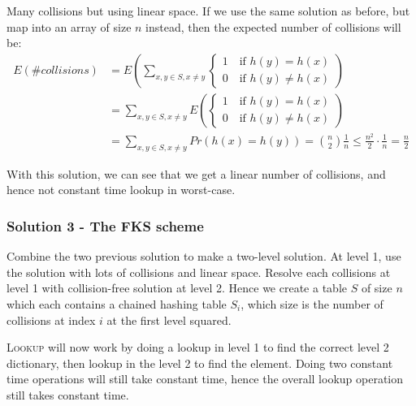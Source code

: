                 Many collisions but using linear space.
                If we use the same solution as before, but map into an array of size $n$ instead, then the expected number of collisions will be:
                \begin{align*}
                    E(\#collisions)
                    &= E\left( \sum_{x,y \in S, x \not = y}
                        \begin{cases}
                            1 \quad \text{if } h(y) = h(x) \\
                            0 \quad \text{if } h(y) \not = h(x)
                        \end{cases}
                        \right) \\
                    &= \sum_{x,y \in S, x \not = y} E \left(
                        \begin{cases}
                            1 \quad \text{if } h(y) = h(x) \\
                            0 \quad \text{if } h(y) \not = h(x)
                        \end{cases}
                        \right) \\
                    &= \sum_{x,y \in S, x \not = y} Pr(h(x) = h(y)) = \binom{n}{2} \frac{1}{n} \leq \frac{n^2}{2} \cdot \frac{1}{n} = \frac{n}{2}
                \end{align*}

                With this solution, we can see that we get a linear number of collisions, and hence not constant time lookup in worst-case.

            \subsubsection{Solution 3 - The FKS scheme}

                Combine the two previous solution to make a two-level solution.
                At level 1, use the solution with lots of collisions and linear space.
                Resolve each collisions at level 1 with collision-free solution at level 2.
                Hence we create a table $S$ of size $n$ which each contains a chained hashing table $S_i$, which size is the number of collisions at index $i$ at the first level squared.

                \textsc{Lookup} will now work by doing a lookup in level 1 to find the correct level 2 dictionary, then lookup in the level 2 to find the element.
                Doing two constant time operations will still take constant time, hence the overall lookup operation still takes constant time.

